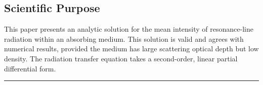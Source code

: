 \documentclass[onecolumn]{aastex63}
\begin{document}
\subsection{Scientific Purpose}
This paper presents an analytic solution for the mean intensity of resonance-line radiation within an absorbing medium. This solution is valid and agrees with numerical results, provided the medium has large scattering optical depth but low density. The radiation transfer equation takes a second-order, linear partial differential form.







\vspace{1cm}
\hrule
\vspace{1cm}
\end{document}

